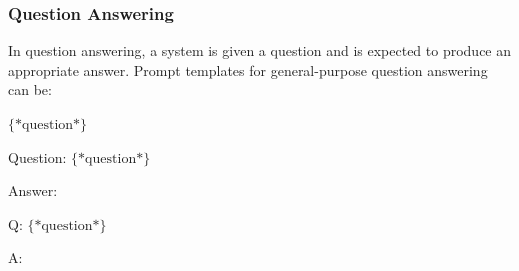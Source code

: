 \subsubsection{Question Answering}

\noindent In question answering, a system is given a question and is expected to produce an appropriate answer. Prompt templates for general-purpose question answering can be:

\vspace{0.5em}
\begin{tcolorbox}

\begingroup
\setlength{\leftskip}{2em}
\setlength{\rightskip}{2em}

$\{*\mathrm{question}*\}$

\vspace{0.3em}

\underline{\hspace{2em}}

\endgroup

\end{tcolorbox}
\vspace{0.5em}

\vspace{0.5em}
\begin{tcolorbox}

\begingroup
\setlength{\leftskip}{2em}
\setlength{\rightskip}{2em}

Question: $\{*\mathrm{question}*\}$

\vspace{0.3em}

Answer: \underline{\hspace{2em}}

\endgroup

\end{tcolorbox}
\vspace{0.5em}

\vspace{0.5em}
\begin{tcolorbox}

\begingroup
\setlength{\leftskip}{2em}
\setlength{\rightskip}{2em}

Q: $\{*\mathrm{question}*\}$

\vspace{0.3em}

A: \underline{\hspace{2em}}

\endgroup

\end{tcolorbox}
\vspace{0.5em}

